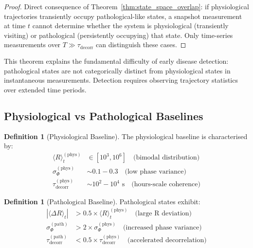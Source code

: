 \documentclass[11pt,twocolumn,a4paper]{article}
\theoremstyle{definition}
\newtheorem{definition}[theorem]{Definition}
\theoremstyle{remark}
\newcommand{\taudecorr}{\tau_{\mathrm{decorr}}}
\begin{document}
\begin{proof}
Direct consequence of Theorem~\ref{thm:state_space_overlap}: if physiological trajectories transiently occupy pathological-like states, a snapshot measurement at time $t$ cannot determine whether the system is physiological (transiently visiting) or pathological (persistently occupying) that state. Only time-series measurements over $T \gg \taudecorr$ can distinguish these cases.
\end{proof}

This theorem explains the fundamental difficulty of early disease detection: pathological states are not categorically distinct from physiological states in instantaneous measurements. Detection requires observing trajectory statistics over extended time periods.



\subsection{Physiological vs Pathological Baselines}

\begin{definition}[Physiological Baseline]
\label{def:physiological_baseline}
The physiological baseline is characterised by:
\begin{align}
\langle R \rangle_t^{\mathrm{(phys)}} &\in [10^3, 10^6] \quad \text{(bimodal distribution)} \label{eq:phys_R} \\
\sigma_\Phi^{\mathrm{(phys)}} &\sim 0.1 - 0.3 \quad \text{(low phase variance)} \label{eq:phys_sigma} \\
\taudecorr^{\mathrm{(phys)}} &\sim 10^2 - 10^4 \text{ s} \quad \text{(hours-scale coherence)} \label{eq:phys_tau}
\end{align}
\end{definition}

\begin{definition}[Pathological Baseline]
\label{def:pathological_baseline}
Pathological states exhibit:
\begin{align}
|\langle \Delta R \rangle_t| &> 0.5 \times \langle R \rangle_t^{\mathrm{(phys)}} \quad \text{(large R deviation)} \label{eq:path_R} \\
\sigma_\Phi^{\mathrm{(path)}} &> 2 \times \sigma_\Phi^{\mathrm{(phys)}} \quad \text{(increased phase variance)} \label{eq:path_sigma} \\
\taudecorr^{\mathrm{(path)}} &< 0.5 \times \taudecorr^{\mathrm{(phys)}} \quad \text{(accelerated decorrelation)} \label{eq:path_tau}
\end{align}
\end{definition}
\end{document}
